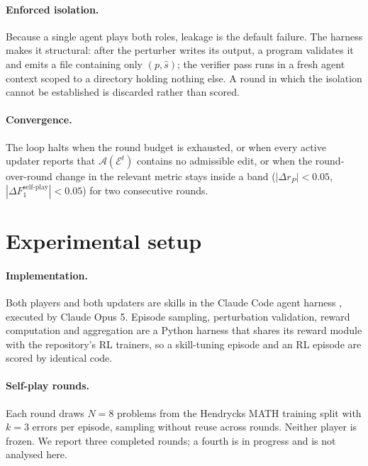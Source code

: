 \documentclass{article} %
\begin{document}
\paragraph{Enforced isolation.} Because a single agent plays both roles, leakage is the
default failure. The harness makes it structural: after the perturber writes its output, a
program validates it and emits a file containing only $(p, \hat{s})$; the verifier pass runs
in a fresh agent context scoped to a directory holding nothing else. A round in which the
isolation cannot be established is discarded rather than scored.

\paragraph{Convergence.} The loop halts when the round budget is exhausted, or when every
active updater reports that $\mathcal{A}(\mathcal{E}^t)$ contains no admissible edit, or
when the round-over-round change in the relevant metric stays inside a band
($|\Delta r_P| < 0.05$, $|\Delta F_1^{\text{self-play}}| < 0.05$) for two consecutive
rounds.

\section{Experimental setup}
\label{sec:setup}

\paragraph{Implementation.} Both players and both updaters are skills in the Claude Code
agent harness \citep{anthropic2025claudecode}, executed by Claude Opus 5. Episode sampling,
perturbation validation, reward computation and aggregation are a Python harness that shares
its reward module with the repository's RL trainers, so a skill-tuning episode and an RL
episode are scored by identical code.

\paragraph{Self-play rounds.} Each round draws $N = 8$ problems from the Hendrycks MATH
training split \citep{hendrycks2021measuring} with $k = 3$ errors per episode, sampling
without reuse across rounds. Neither player is frozen. We report three completed rounds; a
fourth is in progress and is not analysed here.
\end{document}
